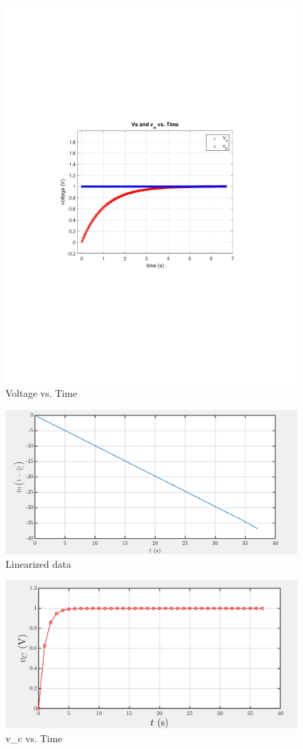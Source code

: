 \documentclass[10pt,twocolumn]{article}
\begin{document}
\begin{figure}[bt]
	\centering
	\includegraphics[width=.9\linewidth]{figures/RCgraph.pdf}
	\caption{Voltage vs. Time}
	\label{fig:RCgraph}
\end{figure}
\begin{figure}[bt]
	\centering
	\includegraphics[width=.9\linewidth]{figures/Linear.PNG}
	\caption{Linearized data}
	\label{fig:Linear}
\end{figure}

\begin{figure}[bt]
	\centering
	\includegraphics[width=.9\linewidth]{figures/vc.jpg}
	\caption{v_{c} vs. Time}
	\label{fig:VC}
\end{figure}
\end{document}
